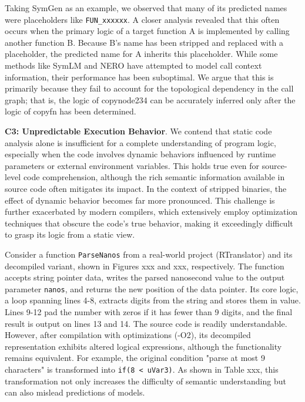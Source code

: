 \documentclass[acmsmall,screen,review,anonymous]{acmart} %
\begin{document}
Taking SymGen as an example, we observed that many of its predicted names were placeholders like \lstinline{FUN_xxxxxx}. A closer analysis revealed that this often occurs when the primary logic of a target function A is implemented by calling another function B. Because B's name has been stripped and replaced with a placeholder, the predicted name for A inherits this placeholder. While some methods like SymLM and NERO have attempted to model call context information, their performance has been suboptimal. We argue that this is primarily because they fail to account for the topological dependency in the call graph; that is, the logic of copynode234 can be accurately inferred only after the logic of copyfn has been determined.

\textbf{C3: Unpredictable Execution Behavior}. We contend that static code analysis alone is insufficient for a complete understanding of program logic, especially when the code involves dynamic behaviors influenced by runtime parameters or external environment variables. This holds true even for source-level code comprehension, although the rich semantic information available in source code often mitigates its impact. In the context of stripped binaries, the effect of dynamic behavior becomes far more pronounced. This challenge is further exacerbated by modern compilers, which extensively employ optimization techniques that obscure the code's true behavior, making it exceedingly difficult to grasp its logic from a static view.

Consider a function \lstinline{ParseNanos} from a real-world project (RTranslator) and its decompiled variant, shown in Figures xxx and xxx, respectively. The function accepts string pointer data, writes the parsed nanosecond value to the output parameter \lstinline{nanos}, and returns the new position of the data pointer. Its core logic, a loop spanning lines 4-8, extracts digits from the string and stores them in value. Lines 9-12 pad the number with zeros if it has fewer than 9 digits, and the final result is output on lines 13 and 14. The source code is readily understandable. However, after compilation with optimizations (-O2), its decompiled representation exhibits altered logical expressions, although the functionality remains equivalent. For example, the original condition "parse at most 9 characters" is transformed into \lstinline{if(8 < uVar3)}. As shown in Table xxx, this transformation not only increases the difficulty of semantic understanding but can also mislead predictions of models.
\end{document}

